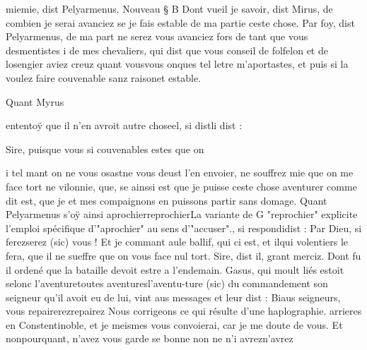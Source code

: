 \documentclass{article}
\begin{document}
\begin{pages}
                     miemie, dist Pelyarmenus.
               Nouveau § B
               Dont vueil je savoir, dist Mirus, de combien je serai avanciez se je fais estable de ma partie
                  ceste chose.
               Par foy, dist Pelyarmenus, de ma part ne serez vous avanciez fors de tant que
                  vous desmentistes i de mes
                     chevaliers, qui dist que vous conseil de 
                     folfelon et de losengier aviez creuz quant 
                     vousvous onques tel letre m’aportastes, et puis si la voulez faire couvenable 
                     sanz raisonet estable.
               
                  Quant Myrus
                     
                        ententoÿ que il n’en avroit 
                        autre choseel, si 
                        distli dist
                  : 
                  
                     Sire, puisque vous si couvenables estes que on
                  
                     i tel mant 
                     on ne vous osastne vous deust l'en envoier, ne souffrez mie que on me face tort ne vilonnie, que, se ainssi
                  est que je puisse ceste chose aventurer comme dit est, que je et mes compaignons
                  en puissons partir sans domage. \pend
            \pstart Quant Pelyarmenus s'oÿ ainsi 
                  aprochierreprochierLa variante de G "reprochier" explicite l'emploi
                  spécifique d'"aprochier" au sens d'"accuser"., si 
                  respondidist : Par Dieu, si 
                     ferezserez (sic) vous ! Et je commant 
                     aule ballif, qui ci est, et 
                     ilqui volentiers le fera, que il ne sueffre que on vous face 
                     nul tort.
               Sire, dist il, grant merciz. Dont fu 
                  il ordené que la bataille devoit estre a l’endemain. Gasus, qui moult liés estoit selonc 
                  l'aventuretoutes aventuresl’aventu-ture (sic) du commandement son seigneur qu’il
               avoit eu de lui, vint aus messages et leur dist : Biaus seigneurs, vous 
                     repairerezrepairez
                     Nous corrigeons ce qui résulte d'une
                        haplographie.
                   arrieres en Constentinoble, et
                  je meismes vous convoierai, car je me doute de vous. Et nonpourquant, n’avez vous garde se bonne non ne 
                     n'i avrezn'avrez
                  

\end{pages}
\end{document}
